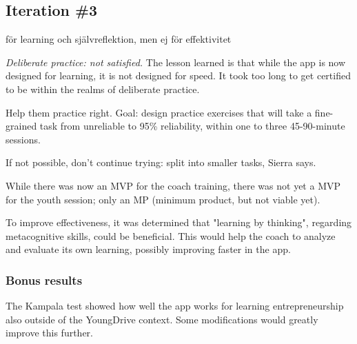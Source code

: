 \subsection{Iteration \#3}

  för learning och självreflektion, men ej för effektivitet

  \textit{Deliberate practice: not satisfied.} The lesson learned is that while the app is now designed for learning, it is not designed for speed. It took too long to get certified to be within the realms of deliberate practice.

  Help them practice right. Goal: design practice exercises that will take a fine-grained task from unreliable to 95\% reliability, within one to three 45-90-minute sessions.

  If not possible, don't continue trying: split into smaller tasks, Sierra says.

  While there was now an MVP for the coach training, there was not yet a MVP for the youth session; only an MP (minimum product, but not viable yet).

  To improve effectiveness, it was determined that "learning by thinking", regarding metacognitive skills, could be beneficial. This would help the coach to analyze and evaluate its own learning, possibly improving faster in the app.

  \subsubsection{Bonus results}
  The Kampala test showed how well the app works for learning entrepreneurship also outside of the YoungDrive context. Some modifications would greatly improve this further.
